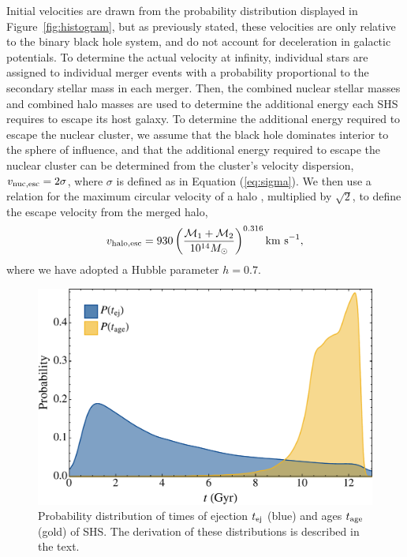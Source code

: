 \documentclass[a4paper,twocolumn]{emulateapj}
\begin{document}
{Initial velocities are drawn from the probability distribution displayed in Figure~\ref{fig:histogram}, but as previously stated, these velocities are only relative to the binary black hole system, and do not account for deceleration in galactic potentials. To determine the actual velocity at infinity, individual stars are assigned to individual merger events with a probability proportional to the secondary stellar mass in each merger. Then, the combined nuclear stellar masses and combined halo masses are used to determine the additional energy each SHS requires to escape its host galaxy. To determine the additional energy required to escape the nuclear cluster, we assume that the black hole dominates interior to the sphere of influence, and that the additional energy required to escape the nuclear cluster can be determined from the cluster's velocity dispersion, $v_{\rm nuc,esc} = 2 \sigma$, where $\sigma$ is defined as in Equation (\ref{eq:sigma}). We then use a relation for the maximum circular velocity of a halo \citep{Klypin:2011a}, multiplied by $\sqrt{2}$, to define the escape velocity from the merged halo,
\begin{equation}
v_{\rm halo,esc} = 930 \left(\frac{{\cal M}_{1} + {\cal M}_{2}}{10^{14} M_{\odot}}\right)^{0.316} {\rm km~s}^{-1},
\end{equation}
where we have adopted a Hubble parameter $h = 0.7$.

\begin{figure}
\centering\includegraphics[width=\linewidth,clip=true]{ages}
\caption{Probability distribution of times of ejection $t_{\rm ej}$ (blue) and ages $t_{\rm age}$ (gold) of SHS. The derivation of these distributions is described in the text.}
\label{fig:ages}
\end{figure}

}
\end{document}
